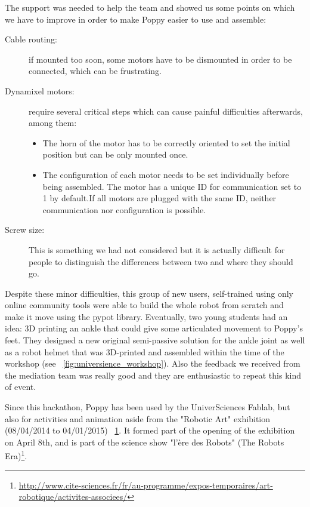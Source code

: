 The support was needed to help the team and showed us some points on which we have to improve in order to make Poppy easier to use and assemble:
\begin{description}
    \item[Cable routing:] if mounted too soon, some motors have to be dismounted in order to be connected, which can be frustrating.
    \item[Dynamixel motors:] require several critical steps which can cause painful difficulties afterwards, among them:
    \begin{itemize}
        \item The horn of the motor has to be correctly oriented to set the initial position but can be only mounted once.
        \item The configuration of each motor needs to be set individually before being assembled. The motor has a unique ID for communication set to 1 by default.If all motors are plugged with the same ID, neither communication nor configuration is possible.
    \end{itemize}
    \item[Screw size:] This is something we had not considered but it is actually difficult for people to distinguish the differences between two and where they should go.
\end{description}

Despite these minor difficulties, this group of new users, self-trained using only online community tools were able to build the whole robot from scratch and make it move using the pypot library. Eventually, two young students  had an idea: 3D printing an ankle that could give some articulated movement to Poppy's feet. They designed a new original semi-passive solution for the ankle joint as well as a robot helmet that was 3D-printed and assembled within the time of the workshop (see \figurename~\ref{fig:universience_workshop}). Also the feedback we received from the mediation team was really good and they are enthusiastic to repeat this kind of event.


\begin{figure}[tb]
\centering
    \hfil
    \caption{}
    \label{fig:universcience_art}
\end{figure}

Since this hackathon, Poppy has been used by the UniverSciences Fablab, but also for activities and animation aside from the "Robotic Art" exhibition (08/04/2014 to 04/01/2015) \figurename~\ref{fig:universcience_art}. It formed part of the opening of the exhibition on April 8th, and is part of the science show "l'ère des Robots" (The Robots Era)\footnote{\url{http://www.cite-sciences.fr/fr/au-programme/expos-temporaires/art-robotique/activites-associees/}}.


